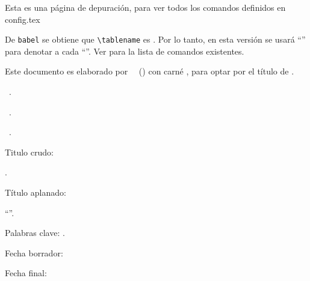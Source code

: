 {}

Esta es una página de depuración, para ver todos los comandos
definidos en config.tex

De \verb+babel+ se obtiene que \verb+\tablename+ es \tablename.  Por
lo tanto, en esta versión se usará ``\latabla'' para denotar a cada
``\tabla''.  Ver  para la lista de comandos
existentes.



Este documento es elaborado por \thesisAuthorAddress~\thesisAuthor\
(\thesisAuthorShort) con carné \thesisAuthorTECID, para optar por el
título de \thesisAuthorDegree.

\genderAsesor\ \nameAsesor.

\genderLectorI\ \nameLectorI.

\genderLectorII\ \nameLectorII.

Titulo crudo:

\begin{center}
  \thesisTitle.  
\end{center}

Título aplanado:

``\thesisFlatTitle''.

Palabras clave: \thesisKeywords.

Fecha borrador: \thesisDraftDate

Fecha final: \thesisFinalDate

